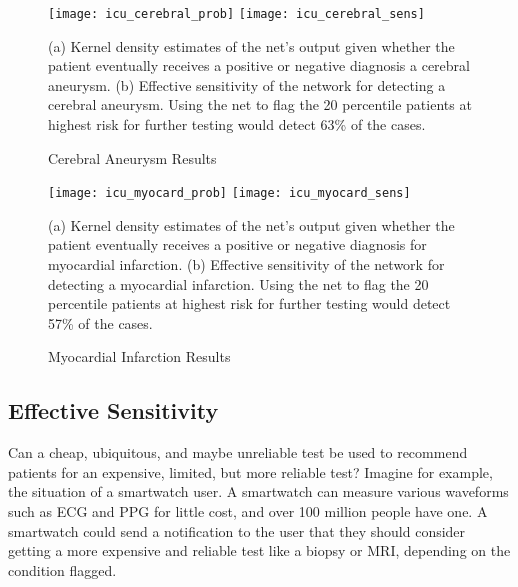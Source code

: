 \begin{figure}
\texttt{[image: icu\_cerebral\_prob]}
\texttt{[image: icu\_cerebral\_sens]}
\caption{Cerebral Aneurysm Results}
\vspace{12px}
(a) Kernel density estimates of the net's output given whether the patient eventually receives a positive or negative diagnosis a cerebral aneurysm. (b) Effective sensitivity of the network for detecting a cerebral aneurysm.  Using the net to flag the 20 percentile patients at highest risk for further testing would detect 63\% of the cases.
\label{fig:icu_cerebral}
\end{figure}
    
\begin{figure}
\texttt{[image: icu\_myocard\_prob]}
\texttt{[image: icu\_myocard\_sens]}
\caption{Myocardial Infarction Results}
\vspace{12px}
(a) Kernel density estimates of the net's output given whether the patient eventually receives a positive or negative diagnosis for myocardial infarction. (b) Effective sensitivity of the network for detecting a myocardial infarction.  Using the net to flag the 20 percentile patients at highest risk for further testing would detect 57\% of the cases.
\label{fig:icu_myocard}
\end{figure}

\pagebreak
\subsection{Effective Sensitivity}

Can a cheap, ubiquitous, and maybe unreliable test be used to recommend patients for an expensive, limited, but more reliable test?  Imagine for example, the situation of a smartwatch user.  A smartwatch can measure various waveforms such as ECG and PPG for little cost, and over 100 million people have one.  A smartwatch could send a notification to the user that they should consider getting a more expensive and reliable test like a biopsy or MRI, depending on the condition flagged.

